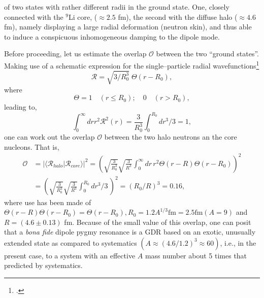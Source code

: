 of two states with rather different radii in the ground state. One, closely connected with the $^{9}$Li core, ($\approx 2.5$ fm), the second with the diffuse halo ($\approx 4.6$ fm), namely displaying a large radial deformation (neutron skin), and thus able to induce a conspicuous inhomogeneous damping to the dipole mode. 


Before proceeding, let us estimate the overlap $\mathcal{O}$ between the two ``ground states''. Making use of a schematic expression for the single--particle radial wavefunctions\footnote{\cite{Bohr:69}.}
\begin{equation}
\mathcal{R}=\sqrt{3/R_0^3}\;\Theta(r-R_0),
\end{equation}
where 
\begin{equation*}
\Theta=1 \quad (r\leq R_0);\quad 0 \quad (r>R_0),
\end{equation*}
leading to,
\begin{equation}
\int_0^{\infty}dr r^2 \mathcal{R}^2(r)=\frac{3}{R_0^3}\int_0^{R_0}dr^3/3=1,
\end{equation}
one can work out the overlap $\mathcal{O}$ between the two halo neutrons an the core nucleons. That is, 
\begin{equation}
\begin{split}
\mathcal{O}&=|\langle\mathcal{R}_{halo}|\mathcal{R}_{core}\rangle|^2=\left(\sqrt{\frac{3}{R_0^3}}\sqrt{\frac{3}{R^3}}\int_0^{\infty}dr\,r^2\Theta(r-R)\Theta(r-R_0)\right)^2\\
&=\left(\sqrt{\frac{3}{R_0^3}}\sqrt{\frac{3}{R^3}}\int_0^{R_0}dr^3/3\,\right)^2=(R_0/R)^3=0.16,
\end{split}
\end{equation}
where use has been made of $\Theta(r-R)\Theta(r-R_0)=\Theta(r-R_0), R_0=1.2A^{1/3} \text{fm}=2.5 \text{fm} (A=9)$ and $R=(4.6\pm 0.13)$ fm.
Because of the small value of this overlap, one can posit that a \textit{bona fide} dipole pygmy resonance is a GDR based on an exotic, unusually extended state as compared to systematics $(A\approx (4.6/1.2)^3\approx 60)$, i.e., in the present case, to  a system with an effective $A$ mass number about 5 times that predicted by systematics.


